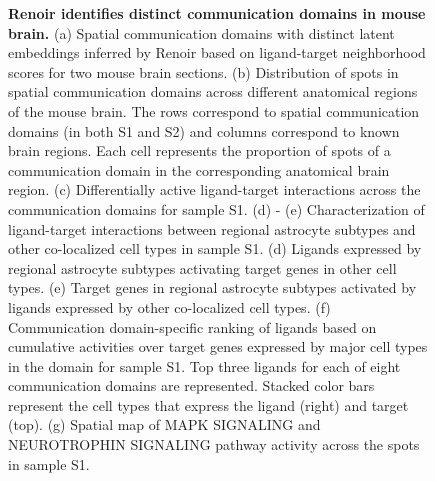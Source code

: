 \begin{figure}[H]
    \centering
    \caption{\textbf{Renoir identifies distinct communication domains in mouse brain.} (a) Spatial communication domains with distinct latent embeddings inferred by Renoir based on ligand-target neighborhood scores for two mouse brain sections. (b) Distribution of spots in spatial communication domains across different anatomical regions of the mouse brain. The rows correspond to spatial communication domains (in both S1 and S2) and columns correspond to known brain regions. Each cell represents the proportion of spots of a communication domain in the corresponding anatomical brain region. (c) Differentially active ligand-target interactions across the communication domains for sample S1. (d) - (e) Characterization of ligand-target interactions between regional astrocyte subtypes and other co-localized cell types in sample S1. (d) Ligands expressed by regional astrocyte subtypes activating target genes in other cell types. (e) Target genes in regional astrocyte subtypes activated by ligands expressed by other co-localized cell types. (f) Communication domain-specific ranking of ligands based on cumulative activities over target genes expressed by major cell types in the domain for sample S1. Top three ligands for each of eight communication domains are represented. Stacked color bars represent the cell types that express the ligand (right) and target (top). (g) Spatial map of MAPK SIGNALING and NEUROTROPHIN SIGNALING pathway activity across the spots in sample S1.}
    \label{Fig MB}
\end{figure}

